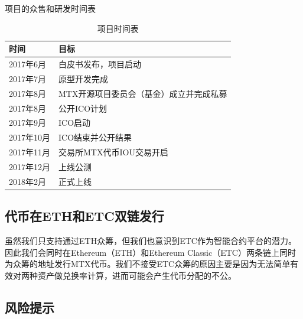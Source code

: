 \documentclass[UTF8,nofonts]{ctexart}
\begin{document}
项目的众售和研发时间表
\begin{table}[hbt]
  \centering
  \begin{tabular}{l|l}
 时间   & 目标\\
    \hline
  2017年6月 & 白皮书发布，项目启动 \\
  2017年7月 & 原型开发完成 \\
  2017年8月 & MTX开源项目委员会（基金）成立并完成私募 \\
  2017年8月 & 公开ICO计划 \\
  2017年9月 & ICO启动 \\
  2017年10月 & ICO结束并公开结果 \\
  2017年11月 & 交易所MTX代币IOU交易开启 \\
  2017年12月 & 上线公测 \\
  2018年2月 & 正式上线 \\
  \end{tabular}
  \caption{项目时间表}
\end{table}

\subsection{代币在ETH和ETC双链发行\label{sec:chains}}

虽然我们只支持通过ETH众筹，但我们也意识到ETC作为智能合约平台的潜力。因此我们会同时在Ethereum（ETH）和Ethereum Classic（ETC）两条链上同时为众筹的地址发行MTX代币。我们不接受ETC众筹的原因主要是因为无法简单有效对两种资产做兑换率计算，进而可能会产生代币分配的不公。


\subsection{风险提示\label{sec:risks}}
\end{document}
